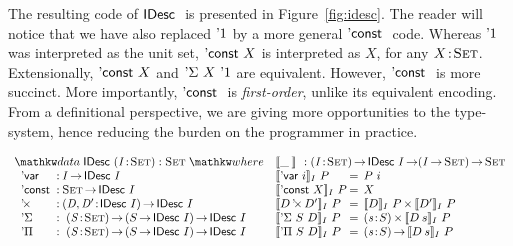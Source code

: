 The resulting code of $\IDesc$ is presented in
Figure~\ref{fig:idesc}. The reader will notice that we have also
replaced $\DUnit$ by a more general $\DConst$ code. Whereas $\DUnit$
was interpreted as the unit set, $\DConst{X}$ is interpreted as $X$,
for any $\Bhab{X}{\Set}$. Extensionally, $\DConst{X}$ and
$\DSigma{X}{\DUnit}$ are equivalent. However, $\DConst$ is more
succinct. More importantly, $\DConst$ is \emph{first-order}, unlike
its equivalent encoding. From a definitional perspective, we are
giving more opportunities to the type-system, hence reducing the
burden on the programmer in practice.

\begin{figure*}

\[
\begin{array}{ll}
\stk{
\data \IDesc{} (\Bhab{\V{I}}{\Set}) : \Set \where \\
\;\;\begin{array}{@{}l@{\::\:}l@{\quad}l}
    \DVar{}         & I \To \IDesc{I}                                   \\
    \DConst{}       & \Set \To \IDesc{I}                                \\
    \DProd{}{}      & \PI{\V{D}, \V{D'}}{\IDesc{I}} \IDesc{I}           \\
    \DSigma         & \PI{\V{S}}{\Set} \PIS{S \To \IDesc{I}} \IDesc{I}  \\
    \DPi            & \PI{\V{S}}{\Set} \PIS{S \To \IDesc{I}} \IDesc{I} 
\end{array}
}
&
\stk{
\idescop{\_\:}{}{} : \PI{\V{I}}{\Set} \IDesc{I} \To (\V{I} \To \Set) \To \Set                  \\
\begin{array}{@{}l@{\:=\:\:}ll}
\idescop{\DVar{i}}{I}{P}      &  P~i                                                 \\
\idescop{\DConst{X}}{I}{P}    &  X                                                   \\
\idescop{\DProd{D}{D'}}{I}{P} &  \TIMES{\idescop{D}{I}{P}}{\idescop{D'}{I}{P}}       \\
\idescop{\DSigma{S}{D}}{I}{P} &  \SIGMA{\V{s}}{S} \idescop{D\: s}{I}{P}                    \\
\idescop{\DPi{S}{D}}{I}{P}    &  \PI{\V{s}}{S} \idescop{D\: s}{I}{P}            
\end{array}
}
\end{array}
\]

\caption{Universe of indexed description}
\label{fig:idesc}

\end{figure*}


